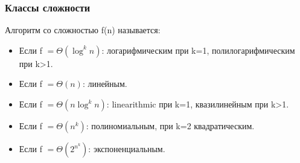 \documentclass[russian, 12pt]{beamer}
\begin{document}
\lstset{style=mystyle}
\begin{frame}

\end{frame}
\lstset{style=mystyle}
\begin{frame}

\end{frame}
\begin{frame}
\frametitle{Классы сложности}
Алгоритм со сложностью f(n) называется:
\begin{itemize}
  \item Если f $=\Theta(\log^kn)$: 
  логарифмическим при k=1, полилогарифмическим при k>1.\\[0.3cm]

  \item Если f $=\Theta(n)$: 
  линейным.\\[0.3cm]

  \item Если f $=\Theta(n\log^kn)$: 
  linearithmic при k=1, квазилинейным при k>1.\\[0.3cm]
  
  \item Если f $=\Theta(n^k)$: 
  полиномиальным, при k=2 квадратическим. \\[0.3cm]
  
  \item Если f $=\Theta(2^{n^k})$: 
  экспоненциальным. \\

\end{itemize}
\end{frame}
\end{document}

